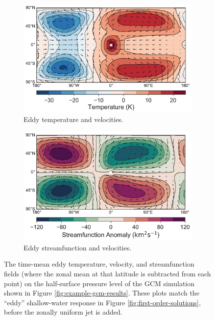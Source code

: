\begin{figure}
  \centering
  \begin{subfigure}[b]{0.47\textwidth}
    \includegraphics[width=\textwidth]{figures/wave-mean-flow/decomp-temp-10day-12.pdf}
    \caption{Eddy temperature and velocities.}
    \label{fig:spherical-low-omega}
  \end{subfigure}
  \quad
  \begin{subfigure}[b]{0.47\textwidth}
    \includegraphics[width=\textwidth]{figures/wave-mean-flow/decomp-sf-10day-12.pdf}
    \caption{Eddy streamfunction and velocities.}
    \label{fig:spherical-low-omega}
  \end{subfigure}
\caption{The time-mean eddy temperature, velocity, and streamfunction fields (where the zonal mean at that latitude is subtracted from each point) on the half-surface pressure level of the GCM simulation shown in Figure \ref{fig:example-gcm-results}. These plots match the ``eddy'' shallow-water response in Figure \ref{fig:first-order-solutions}, before the zonally uniform jet is added.}\label{fig:eddy-gcm-results}
\end{figure}
